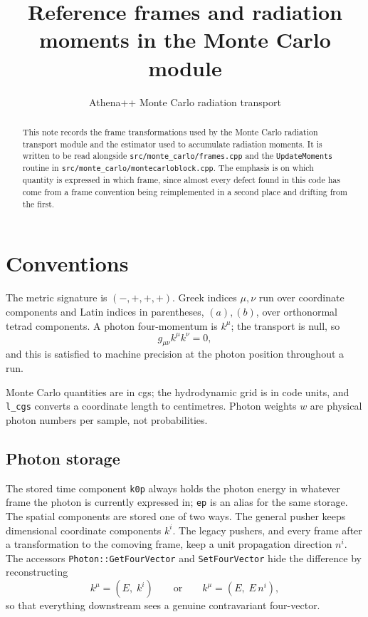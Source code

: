 \documentclass[11pt]{article}
\title{Reference frames and radiation moments in the Monte Carlo module}
\author{Athena++ Monte Carlo radiation transport}
\date{}
\begin{document}
\maketitle

\begin{abstract}
This note records the frame transformations used by the Monte Carlo radiation transport
module and the estimator used to accumulate radiation moments. It is written to be read
alongside \texttt{src/monte\_carlo/frames.cpp} and the \texttt{UpdateMoments} routine in
\texttt{src/monte\_carlo/montecarloblock.cpp}. The emphasis is on which quantity is
expressed in which frame, since almost every defect found in this code has come from a
frame convention being reimplemented in a second place and drifting from the first.
\end{abstract}

\section{Conventions}

The metric signature is $(-,+,+,+)$. Greek indices $\mu,\nu$ run over coordinate
components and Latin indices in parentheses, $(a),(b)$, over orthonormal tetrad
components. A photon four-momentum is $k^\mu$; the transport is null, so
\begin{equation}
  g_{\mu\nu} k^\mu k^\nu = 0 ,
  \label{eq:null}
\end{equation}
and this is satisfied to machine precision at the photon position throughout a run.

Monte Carlo quantities are in cgs; the hydrodynamic grid is in code units, and
\texttt{l\_cgs} converts a coordinate length to centimetres. Photon weights $w$ are
physical photon numbers per sample, not probabilities.

\subsection{Photon storage}

The stored time component \texttt{k0p} always holds the photon energy in whatever frame
the photon is currently expressed in; \texttt{ep} is an alias for the same storage. The
spatial components are stored one of two ways. The general pusher keeps dimensional
coordinate components $k^i$. The legacy pushers, and every frame after a transformation
to the comoving frame, keep a unit propagation direction $n^i$. The accessors
\texttt{Photon::GetFourVector} and \texttt{SetFourVector} hide the difference by
reconstructing
\begin{equation}
  k^\mu = \left( E,\; k^i \right)
  \qquad\text{or}\qquad
  k^\mu = \left( E,\; E\, n^i \right) ,
\end{equation}
so that everything downstream sees a genuine contravariant four-vector.
\end{document}
